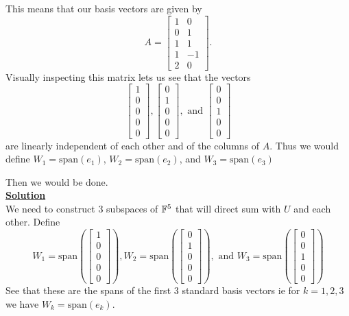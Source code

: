 \documentclass[answers]{exam}
\newcommand{\spanV}[1]{\text{span}\left(#1\right)}
\begin{document}
\begin{questions}
\begin{solution}
        This means that our basis vectors are given by
        $$A = \begin{bmatrix}
            1 & 0\\
            0 & 1\\
            1 & 1\\
            1 & -1\\
            2 & 0
        \end{bmatrix}.$$
        Visually inspecting this matrix lets us see that the vectors
        $$
            \begin{bmatrix}1 \\ 0\\ 0\\ 0\\ 0\end{bmatrix}, \begin{bmatrix}0\\1\\0\\0\\0\end{bmatrix}, \text{ and }\begin{bmatrix}0\\0\\1\\0\\0\end{bmatrix}
        $$
        are linearly independent of each other and of the columns of $A$.
        Thus we would define $W_1=\spanV{e_1}$, $W_2=\spanV{e_2}$, and $W_3=\spanV{e_3}$

        Then we would be done.\\
        \underline{\textbf{Solution}}\\
        We need to construct $3$ subspaces of $\mathbb{F}^5$ that will direct sum with $U$ and each other. Define
        \[
            W_1 = \spanV{\begin{bmatrix}1 \\ 0\\ 0\\ 0\\ 0\end{bmatrix}}, W_2=\spanV{\begin{bmatrix}0\\1\\0\\0\\0\end{bmatrix}}, \text{ and }W_3=\spanV{\begin{bmatrix}0\\0\\1\\0\\0\end{bmatrix}}
        \]
        See that these are the spans of the first 3 standard basis vectors ie for $k=1,2,3$ we have
        $W_k=\spanV{e_k}$.


\end{solution}
\end{questions}
\end{document}
